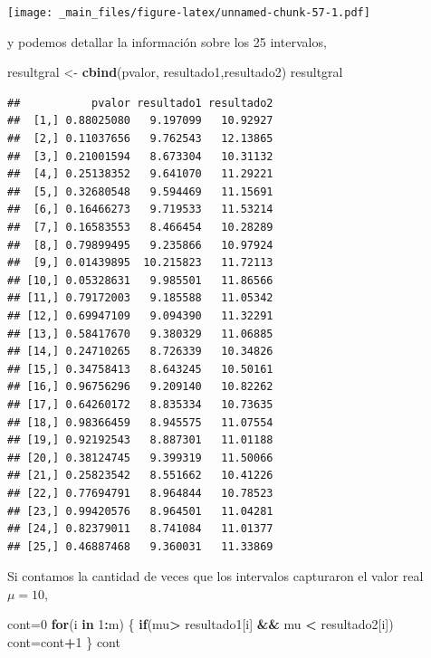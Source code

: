 \documentclass[
]{book}
\newenvironment{Shaded}{\begin{snugshade}}{\end{snugshade}}
\newcommand{\ControlFlowTok}[1]{\textcolor[rgb]{0.13,0.29,0.53}{\textbf{#1}}}
\newcommand{\DecValTok}[1]{\textcolor[rgb]{0.00,0.00,0.81}{#1}}
\newcommand{\FunctionTok}[1]{\textcolor[rgb]{0.13,0.29,0.53}{\textbf{#1}}}
\newcommand{\NormalTok}[1]{#1}
\newcommand{\OtherTok}[1]{\textcolor[rgb]{0.56,0.35,0.01}{#1}}
\newcommand{\SpecialCharTok}[1]{\textcolor[rgb]{0.81,0.36,0.00}{\textbf{#1}}}
\begin{document}
\texttt{[image: \_main\_files/figure-latex/unnamed-chunk-57-1.pdf]}

y podemos detallar la información sobre los 25 intervalos,

\begin{Shaded}
\begin{Highlighting}[]
\NormalTok{resultgral }\OtherTok{\textless{}{-}} \FunctionTok{cbind}\NormalTok{(pvalor, resultado1,resultado2)}
\NormalTok{resultgral}
\end{Highlighting}
\end{Shaded}

\begin{verbatim}
##           pvalor resultado1 resultado2
##  [1,] 0.88025080   9.197099   10.92927
##  [2,] 0.11037656   9.762543   12.13865
##  [3,] 0.21001594   8.673304   10.31132
##  [4,] 0.25138352   9.641070   11.29221
##  [5,] 0.32680548   9.594469   11.15691
##  [6,] 0.16466273   9.719533   11.53214
##  [7,] 0.16583553   8.466454   10.28289
##  [8,] 0.79899495   9.235866   10.97924
##  [9,] 0.01439895  10.215823   11.72113
## [10,] 0.05328631   9.985501   11.86566
## [11,] 0.79172003   9.185588   11.05342
## [12,] 0.69947109   9.094390   11.32291
## [13,] 0.58417670   9.380329   11.06885
## [14,] 0.24710265   8.726339   10.34826
## [15,] 0.34758413   8.643245   10.50161
## [16,] 0.96756296   9.209140   10.82262
## [17,] 0.64260172   8.835334   10.73635
## [18,] 0.98366459   8.945575   11.07554
## [19,] 0.92192543   8.887301   11.01188
## [20,] 0.38124745   9.399319   11.50066
## [21,] 0.25823542   8.551662   10.41226
## [22,] 0.77694791   8.964844   10.78523
## [23,] 0.99420576   8.964501   11.04281
## [24,] 0.82379011   8.741084   11.01377
## [25,] 0.46887468   9.360031   11.33869
\end{verbatim}

Si contamos la cantidad de veces que los intervalos capturaron el valor real \(\mu=10\),

\begin{Shaded}
\begin{Highlighting}[]
\NormalTok{cont}\OtherTok{=}\DecValTok{0}
\ControlFlowTok{for}\NormalTok{(i }\ControlFlowTok{in} \DecValTok{1}\SpecialCharTok{:}\NormalTok{m)}
\NormalTok{\{}
  \ControlFlowTok{if}\NormalTok{(mu}\SpecialCharTok{\textgreater{}}\NormalTok{ resultado1[i] }\SpecialCharTok{\&\&}\NormalTok{ mu }\SpecialCharTok{\textless{}}\NormalTok{ resultado2[i])}
\NormalTok{    cont}\OtherTok{=}\NormalTok{cont}\SpecialCharTok{+}\DecValTok{1}
\NormalTok{\}}
\NormalTok{cont}
\end{Highlighting}
\end{Shaded}
\end{document}
